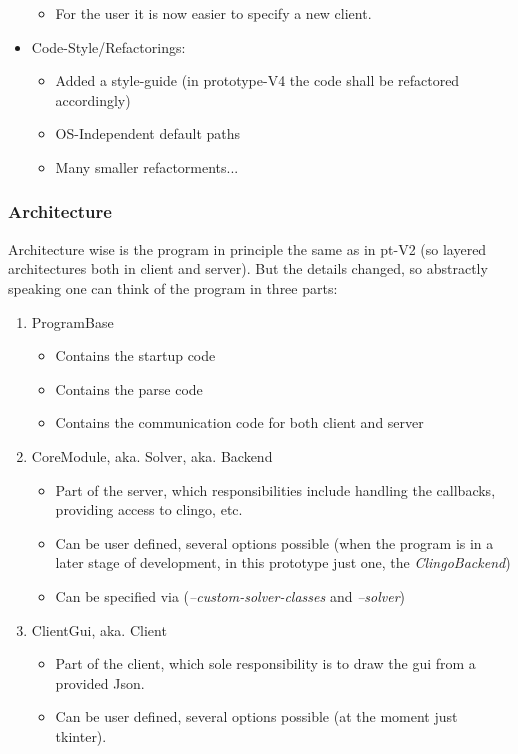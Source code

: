 \documentclass[12pt,a4paper]{article}
\newcommand{\<}[1]{\guilsinglleft}
\renewcommand{\>}[1]{\guilsinglright}
\begin{document}
\begin{itemize}
\begin{itemize}
        \item For the user it is now easier to specify a new client.
    \end{itemize}
    \item Code-Style/Refactorings:
    \begin{itemize}
        \item Added a style-guide (in prototype-V4 the code shall be refactored accordingly)
        \item OS-Independent default paths  
        \item Many smaller refactorments...
    \end{itemize}
\end{itemize}

\subsubsection{Architecture}

\noindent Architecture wise is the program in principle the same as in pt-V2 (so layered architectures both in client and server). But the details changed, so abstractly speaking one can think of the program in three parts:

\begin{enumerate}
    \item ProgramBase
    \begin{itemize}
        \item Contains the startup code
        \item Contains the parse code
        \item Contains the communication code for both client and server
    \end{itemize}
    \item CoreModule, aka. Solver, aka. Backend
    \begin{itemize}
        \item Part of the server, which responsibilities include handling the callbacks, providing access to clingo, etc.
        \item Can be user defined, several options possible (when the program is in a later stage of development, in this prototype just one, the \textit{ClingoBackend})
        \item Can be specified via (\textit{--custom-solver-classes} and \textit{--solver})
    \end{itemize}
    \item ClientGui, aka. Client
    \begin{itemize}
        \item Part of the client, which sole responsibility is to draw the gui from a provided Json.
        \item Can be user defined, several options possible (at the moment just tkinter).
    \end{itemize}
\end{enumerate}
\end{document}
